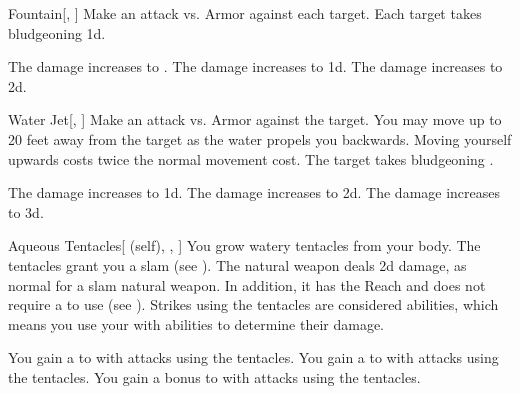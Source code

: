 \lowercase{\hypertarget{spell:Fountain}{}}\label{spell:Fountain}
\begin{freeability}[Rank 1]{\hypertarget{spell:Fountain}{Fountain}}[, ]
Make an attack vs. Armor against each target.
\hit Each target takes bludgeoning  \minus1d.

\rankline
{} The damage increases to .
 The damage increases to  \plus1d.
 The damage increases to  \plus2d.

\end{freeability}
\vspace{0.25em}



\lowercase{\hypertarget{spell:Water Jet}{}}\label{spell:Water Jet}
\begin{freeability}[Rank 1]{\hypertarget{spell:Water Jet}{Water Jet}}[, ]
Make an attack vs. Armor against the target.
You may move up to 20 feet away from the target as the water propels you backwards.
Moving yourself upwards costs twice the normal movement cost.
\hit The target takes bludgeoning .

\rankline
{} The damage increases to  \plus1d.
 The damage increases to  \plus2d.
 The damage increases to  \plus3d.

\end{freeability}
\vspace{0.25em}



\lowercase{\hypertarget{spell:Aqueous Tentacles}{}}\label{spell:Aqueous Tentacles}
\begin{attuneability}[Rank 2]{\hypertarget{spell:Aqueous Tentacles}{Aqueous Tentacles}}[ (self), , ]
You grow watery tentacles from your body.
The tentacles grant you a slam  (see ).
The natural weapon deals \plus2d damage, as normal for a slam natural weapon.
In addition, it has the Reach  and does not require a  to use (see ).
Strikes using the tentacles are considered  abilities, which means you use your  with  abilities to determine their damage.

\rankline
{} You gain a   to  with attacks using the tentacles.
 You gain a   to  with attacks using the tentacles.
 You gain a  bonus to  with attacks using the tentacles.

\end{attuneability}
\vspace{0.25em}



